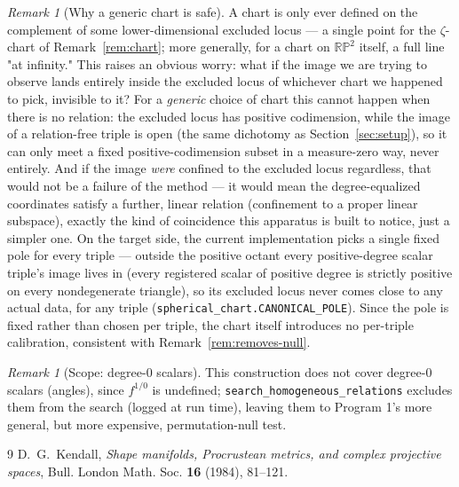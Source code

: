 \documentclass[11pt,reqno]{amsart}
\numberwithin{equation}{section}
\theoremstyle{definition}
\theoremstyle{remark}
\newtheorem{remark}[theorem]{Remark}
\begin{document}
\begin{remark}[Why a generic chart is safe]
A chart is only ever defined on the complement of some lower-dimensional
excluded locus --- a single point for the $\zeta$-chart of
Remark~\ref{rem:chart}; more generally, for a chart on $\mathbb{RP}^2$
itself, a full line "at infinity." This raises an obvious worry: what if
the image we are trying to observe lands entirely inside the excluded locus
of whichever chart we happened to pick, invisible to it? For a
\emph{generic} choice of chart this cannot happen when there is no
relation: the excluded locus has positive codimension, while the image of a
relation-free triple is open (the same dichotomy as
Section~\ref{sec:setup}), so it can only meet a fixed positive-codimension
subset in a measure-zero way, never entirely. And if the image \emph{were}
confined to the excluded locus regardless, that would not be a failure of
the method --- it would mean the degree-equalized coordinates satisfy a
further, linear relation (confinement to a proper linear subspace), exactly
the kind of coincidence this apparatus is built to notice, just a simpler
one. On the target side, the current implementation picks a single fixed
pole for every triple --- outside the positive octant every positive-degree
scalar triple's image lives in (every registered scalar of positive degree
is strictly positive on every nondegenerate triangle), so its excluded
locus never comes close to any actual data, for any triple
(\texttt{spherical\_chart.CANONICAL\_POLE}). Since the pole is fixed rather
than chosen per triple, the chart itself introduces no per-triple
calibration, consistent with Remark~\ref{rem:removes-null}.
\end{remark}

\begin{remark}[Scope: degree-$0$ scalars]
This construction does not cover degree-$0$ scalars (angles), since
$f^{1/0}$ is undefined; \texttt{search\_homogeneous\_relations} excludes
them from the search (logged at run time), leaving them to Program 1's more
general, but more expensive, permutation-null test.
\end{remark}

\begin{thebibliography}{9}
 D.~G.~Kendall, \emph{Shape manifolds, Procrustean
  metrics, and complex projective spaces}, Bull. London Math. Soc.
  \textbf{16} (1984), 81--121.
\end{thebibliography}
\end{document}
